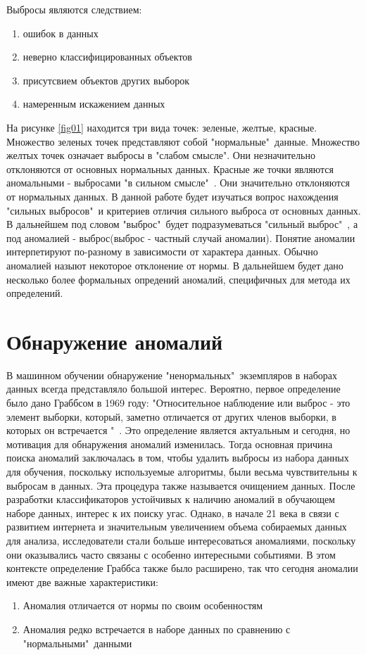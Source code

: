 \break




Выбросы являются следствием:
\begin{enumerate}
	\item ошибок в данных
	\item неверно классифицированных объектов
	\item присутсвием объектов других выборок
	\item намеренным искажением данных
\end{enumerate}
На рисунке \ref{fig01} находится три вида точек: зеленые, желтые, красные. Множество зеленых точек представляют собой "нормальные"\ данные. Множество желтых точек означает  выбросы в "слабом смысле". Они незначительно отклоняются от основных  нормальных данных. Красные же точки являются аномальными - выбросами "в сильном смысле"\ . Они значительно  отклоняются  от нормальных данных. В данной работе будет изучаться вопрос нахождения "сильных выбросов"\  и  критериев отличия сильного выброса от основных данных. В дальнейшем под словом "выброс"\ будет подразумеваться "сильный выброс"\ ,  а под  аномалией -  выброс(выброс - частный случай аномалии).
Понятие аномалии  интерпетируют по-разному в зависимости от характера данных. Обычно аномалией назыют некоторое отклонение от нормы. В дальнейшем будет дано несколько более формальных опредений аномалий, специфичных для метода их определений.

\section{Обнаружение аномалий}
В машинном обучении обнаружение  "ненормальных"\ экземпляров в наборах данных всегда представляло большой интерес. Вероятно, первое определение было дано Граббсом\cite{Book02} в 1969 году: "Относительное наблюдение или выброс - это элемент выборки, который, заметно отличается от других членов выборки, в которых он встречается "\ .
Это определение является актуальным и сегодня, но мотивация для обнаружения аномалий изменилась. Тогда основная причина поиска аномалий заключалась в том, чтобы удалить выбросы из набора данных для обучения, поскольку   используемые алгоритмы, были весьма чувствительны к выбросам в данных. Эта процедура также называется очищением данных. После разработки классификаторов устойчивых к наличию аномалий в обучающем наборе данных, интерес к их поиску угас. Однако, в начале 21 века в связи с развитием интернета и значительным увеличением объема собираемых данных для анализа, исследователи стали больше интересоваться  аномалиями, поскольку они  оказывались часто связаны с особенно интересными событиями.  В этом контексте определение Граббса также было расширено, так что сегодня аномалии имеют две важные характеристики:
\begin{enumerate}
	\item Аномалия отличается от нормы по своим особенностям
	\item Аномалия редко встречается в наборе данных по сравнению с "нормальными"\  данными
\end{enumerate}
